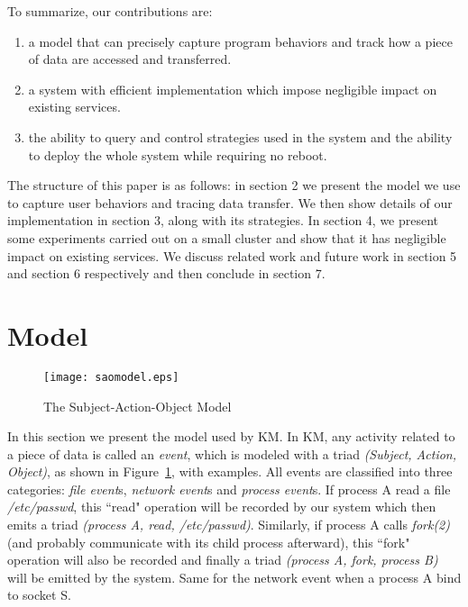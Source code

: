 \documentclass[letterpaper,twocolumn,10pt]{article}
\begin{document}
To summarize, our contributions are:
\begin{enumerate}
    \item a model that can precisely capture program behaviors and track how
        a piece of data are accessed and transferred.
    \item a system with efficient implementation which impose negligible
        impact on existing services.
    \item the ability to query and control strategies used in the system and
        the ability to deploy the whole system while requiring no reboot.
\end{enumerate}

The structure of this paper is as follows: in section 2 we present the model
we use to capture user behaviors and tracing data transfer. We then show
details of our implementation in section 3, along with its strategies. In
section 4, we present some experiments carried out on a small cluster and
show that it has negligible impact on existing services. We discuss related
work and future work in section 5 and section 6 respectively and then
conclude in section 7.

\section{Model} \label{sec:themodel}

\begin{figure}[t]
    \centering
    \texttt{[image: saomodel.eps]}
    \caption{The Subject-Action-Object Model}
    \label{fig:saomodel}
\end{figure}

In this section we present the model used by KM. In KM, any activity related
to a piece of data is called an \textit{event}, which is modeled with a triad
\textit{(Subject, Action, Object)}, as shown in Figure~\ref{fig:saomodel},
with examples. All events are classified into three categories: \textit{file
event}s, \textit{network event}s and \textit{process event}s. If process A
read a file \textit{/etc/passwd}, this ``read" operation will be recorded by
our system which then emits a triad \textit{(process A, read, /etc/passwd)}.
Similarly, if process A calls \textit{fork(2)} (and probably communicate with
its child process afterward), this ``fork" operation will also be recorded
and finally a triad \textit{(process A, fork, process B)} will be emitted by
the system. Same for the network event when a process A bind to socket S. 
\end{document}
